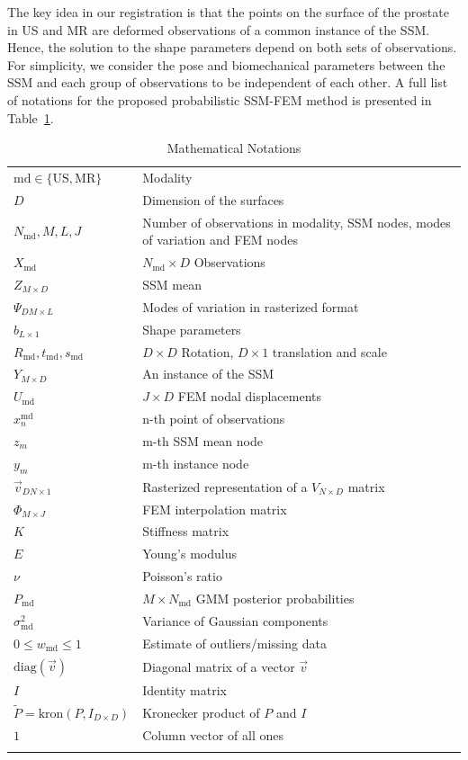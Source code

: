 \documentclass[journal]{IEEEtran}
\newcommand{\diag}{\mathrm{diag}}
\newcommand{\kron}{\mathrm{kron}}
\begin{document}
The key idea in our registration is that the points on the surface of the prostate in US and MR are deformed observations of a common instance of the SSM. Hence, the solution to the shape parameters depend on both sets of observations. For simplicity, we consider the pose and biomechanical parameters between the SSM and each group of observations to be independent of each other. A full list of notations for the proposed probabilistic SSM-FEM method is presented in Table~\ref{tbl:notation}.
\begin{table}[!bht]
  \centering
  \caption{Mathematical Notations \label{tbl:notation}}
  \begin{tabular}{lp{}}
  \hline
    $\mathrm{md}\in\{\mathrm{US},\mathrm{MR}\}$ & Modality\\
    $D$ & Dimension of the surfaces\\
    $N_\mathrm{md},M,L,J$ & Number of observations in modality, SSM nodes, modes of variation and FEM nodes\\
    $X_\mathrm{md}$ & ${N_\mathrm{md}\times D}$ Observations\\
    $Z_{M\times D}$ & SSM mean\\
    $\Psi_{DM\times L}$ & Modes of variation in rasterized format\\
    $b_{L\times 1}$ & Shape parameters\\
    $R_\mathrm{md},t_\mathrm{md},s_\mathrm{md}$ & $D\times D$ Rotation, $D\times 1$ translation and scale\\
    $Y_{M\times D}$ & An instance of the SSM\\
    $U_\mathrm{md}$ & ${J\times D}$ FEM nodal displacements\\
    $x^\mathrm{md}_n$ & n-th point of observations\\
    $z_m$ & m-th SSM mean node\\
    $y_m$ & m-th instance node\\
    $\vec{v}_{DN \times 1}$ & Rasterized representation of a $V_{N\times D}$ matrix\\
    $\Phi_{M\times J}$ & FEM interpolation matrix\\
    $K$ & Stiffness matrix\\
    $E$ & Young's modulus\\
    $\nu$ & Poisson's ratio\\
    $P_{\mathrm{md}}$ & $M\times N_\mathrm{md}$ GMM posterior probabilities\\ 
    $\sigma_{\mathrm{md}}^2$ & Variance of Gaussian components\\
    $0{\leq}w_{\mathrm{md}}{\leq}1$ & Estimate of outliers/missing data\\
    $\diag{(\vec{v})}$ & Diagonal matrix of a vector $\vec{v}$\\
    $I$ & Identity matrix\\
    $\tilde{P} = \kron{(P,I_{D\times{D}})}$ &Kronecker product of $P$ and $I$\\
    $1$ & Column vector of all ones\\
    \hline\\
  \end{tabular}
\end{table}
\end{document}
